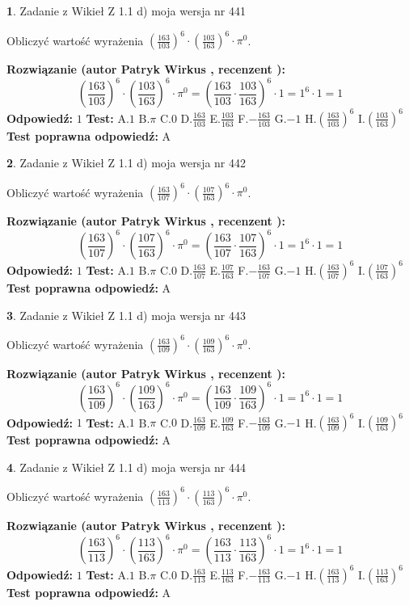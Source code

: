 \documentclass[12pt, a4paper]{article}
\theoremstyle{definition} %
\newtheorem{zad}{}
\newcommand{\zadStart}[1]{\begin{zad}#1\newline}
\newcommand{\zadStop}{\end{zad}}
\newcommand{\rozwStart}[2]{\noindent \textbf{Rozwiązanie (autor #1 , recenzent #2): }\newline}
\newcommand{\rozwStop}{\newline}
\newcommand{\odpStart}{\noindent \textbf{Odpowiedź:}\newline}
\newcommand{\odpStop}{\newline}
\newcommand{\testStart}{\noindent \textbf{Test:}\newline}
\newcommand{\testStop}{\newline}
\newcommand{\kluczStart}{\noindent \textbf{Test poprawna odpowiedź:}\newline}
\newcommand{\kluczStop}{\newline}
\begin{document}
\zadStart{Zadanie z Wikieł Z 1.1 d) moja wersja nr 441}

Obliczyć wartość wyrażenia $(\frac{163}{103})^{6} \cdot (\frac{103}{163})^{6} \cdot \pi^{0}$.
\zadStop
\rozwStart{Patryk Wirkus}{}
$$(\frac{163}{103})^{6} \cdot (\frac{103}{163})^{6} \cdot \pi^{0} = (\frac{163}{103} \cdot \frac{103}{163})^{6} \cdot 1 = 1^{6} \cdot 1 = 1$$
\rozwStop
\odpStart
$1$
\odpStop
\testStart
A.$1$ B.$\pi$ C.$0$ D.$\frac{163}{103}$ E.$\frac{103}{163}$
F.$-\frac{163}{103}$ G.$-1$
H.$(\frac{163}{103})^{6}$
I.$(\frac{103}{163})^{6}$
\testStop
\kluczStart
A
\kluczStop



\zadStart{Zadanie z Wikieł Z 1.1 d) moja wersja nr 442}

Obliczyć wartość wyrażenia $(\frac{163}{107})^{6} \cdot (\frac{107}{163})^{6} \cdot \pi^{0}$.
\zadStop
\rozwStart{Patryk Wirkus}{}
$$(\frac{163}{107})^{6} \cdot (\frac{107}{163})^{6} \cdot \pi^{0} = (\frac{163}{107} \cdot \frac{107}{163})^{6} \cdot 1 = 1^{6} \cdot 1 = 1$$
\rozwStop
\odpStart
$1$
\odpStop
\testStart
A.$1$ B.$\pi$ C.$0$ D.$\frac{163}{107}$ E.$\frac{107}{163}$
F.$-\frac{163}{107}$ G.$-1$
H.$(\frac{163}{107})^{6}$
I.$(\frac{107}{163})^{6}$
\testStop
\kluczStart
A
\kluczStop



\zadStart{Zadanie z Wikieł Z 1.1 d) moja wersja nr 443}

Obliczyć wartość wyrażenia $(\frac{163}{109})^{6} \cdot (\frac{109}{163})^{6} \cdot \pi^{0}$.
\zadStop
\rozwStart{Patryk Wirkus}{}
$$(\frac{163}{109})^{6} \cdot (\frac{109}{163})^{6} \cdot \pi^{0} = (\frac{163}{109} \cdot \frac{109}{163})^{6} \cdot 1 = 1^{6} \cdot 1 = 1$$
\rozwStop
\odpStart
$1$
\odpStop
\testStart
A.$1$ B.$\pi$ C.$0$ D.$\frac{163}{109}$ E.$\frac{109}{163}$
F.$-\frac{163}{109}$ G.$-1$
H.$(\frac{163}{109})^{6}$
I.$(\frac{109}{163})^{6}$
\testStop
\kluczStart
A
\kluczStop



\zadStart{Zadanie z Wikieł Z 1.1 d) moja wersja nr 444}

Obliczyć wartość wyrażenia $(\frac{163}{113})^{6} \cdot (\frac{113}{163})^{6} \cdot \pi^{0}$.
\zadStop
\rozwStart{Patryk Wirkus}{}
$$(\frac{163}{113})^{6} \cdot (\frac{113}{163})^{6} \cdot \pi^{0} = (\frac{163}{113} \cdot \frac{113}{163})^{6} \cdot 1 = 1^{6} \cdot 1 = 1$$
\rozwStop
\odpStart
$1$
\odpStop
\testStart
A.$1$ B.$\pi$ C.$0$ D.$\frac{163}{113}$ E.$\frac{113}{163}$
F.$-\frac{163}{113}$ G.$-1$
H.$(\frac{163}{113})^{6}$
I.$(\frac{113}{163})^{6}$
\testStop
\kluczStart
A
\kluczStop
\end{document}
